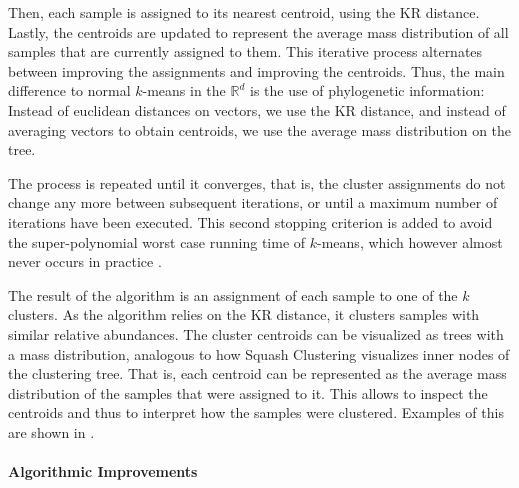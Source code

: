 Then, each sample is assigned to its nearest centroid, using the KR distance. %
Lastly, the centroids are updated to represent
the average mass distribution of all samples that are currently assigned to them.
This iterative process alternates between improving the assignments and improving the centroids.
Thus, the main difference to normal $k$-means in the $\mathbb{R}^d$ is the use of phylogenetic information:
Instead of euclidean distances on vectors, we use the KR distance,
and instead of averaging vectors to obtain centroids, we use the average mass distribution on the tree.

The process is repeated until it converges,
that is, the cluster assignments do not change any more between subsequent iterations,
or until a maximum number of iterations have been executed.
This second stopping criterion is added to avoid the super-polynomial worst case running time of $k$-means,
which however almost never occurs in practice \cite{Bottou1995,Arthur2006}.

The result of the algorithm is an assignment of each sample to one of the $k$ clusters.
As the algorithm relies on the KR distance, it clusters samples with similar relative abundances.
The cluster centroids can be visualized as trees with a mass distribution,
analogous to how Squash Clustering visualizes inner nodes of the clustering tree.
That is, each centroid can be represented as the average mass distribution of the samples that were assigned to it.
This allows to inspect the centroids and thus to interpret how the samples were clustered.
Examples of this are shown in .


\paragraph{Algorithmic Improvements}
\label{ch:Clustering:sec:Methods:sub:PhylogeneticKmeans:par:AlgorithmicImprovements}

